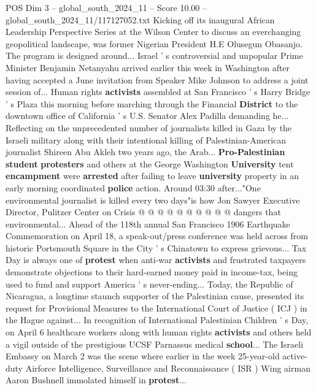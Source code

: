\begin{textsample}{POS Dim 3 – global\_south\_2024\_11 – Score 10.00 – global\_south\_2024\_11/117127052.txt}  \label{ex:f3_pos_324}
Kicking off its inaugural African Leadership Perspective Series at the Wilson Center to discuss an everchanging geopolitical landscape, was former Nigerian President H.E Olusegun Obasanjo.
The program is designed around...
Israel ' s controversial and unpopular Prime Minister Benjamin Netanyahu arrived earlier this week in Washington after having accepted a June invitation from Speaker Mike Johnson to address a joint session of...
Human rights \textbf{activists} assembled at San Francisco ' s Harry Bridge ' s Plaza this morning before marching through the Financial \textbf{District} to the downtown office of California ' s U.S.
Senator Alex Padilla demanding he...
Reflecting on the unprecedented number of journalists killed in Gaza by the Israeli military along with their intentional killing of Palestinian-American journalist Shireen Abu Akleh two years ago, the Arab... \textbf{Pro-Palestinian} \textbf{student} \textbf{protesters} and others at the George Washington \textbf{University} tent \textbf{encampment} were \textbf{arrested} after failing to leave \textbf{university} property in an early morning coordinated \textbf{police} action.
Around 03:30 after..."One environmental journalist is killed every two days"is how Jon Sawyer Executive Director, Pulitzer Center on Crisis @ @ @ @ @ @ @ @ @ @ dangers that environmental...
Ahead of the 118th annual San Francisco 1906 Earthquake Commemoration on April 18, a speak-out/press conference was held across from historic Portsmouth Square in the City ' s Chinatown to express grievous...
Tax Day is always one of \textbf{protest} when anti-war \textbf{activists} and frustrated taxpayers demonstrate objections to their hard-earned money paid in income-tax, being used to fund and support America ' s never-ending...
Today, the Republic of Nicaragua, a longtime staunch supporter of the Palestinian cause, presented its request for Provisional Measures to the International Court of Justice ( ICJ ) in the Hague against...
In recognition of International Palestinian Children ' s Day, on April 6 healthcare workers along with human rights \textbf{activists} and others held a vigil outside of the prestigious UCSF Parnassus medical \textbf{school}...
The Israeli Embassy on March 2 was the scene where earlier in the week 25-year-old active-duty Airforce Intelligence, Surveillance and Reconnaissance ( ISR ) Wing airman Aaron Bushnell immolated himself in \textbf{protest}...

\end{textsample}
